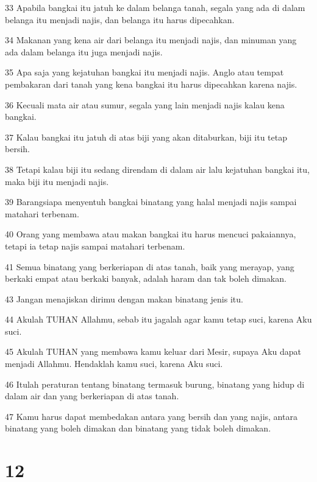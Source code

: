 \par 33 Apabila bangkai itu jatuh ke dalam belanga tanah, segala yang ada di dalam belanga itu menjadi najis, dan belanga itu harus dipecahkan.
\par 34 Makanan yang kena air dari belanga itu menjadi najis, dan minuman yang ada dalam belanga itu juga menjadi najis.
\par 35 Apa saja yang kejatuhan bangkai itu menjadi najis. Anglo atau tempat pembakaran dari tanah yang kena bangkai itu harus dipecahkan karena najis.
\par 36 Kecuali mata air atau sumur, segala yang lain menjadi najis kalau kena bangkai.
\par 37 Kalau bangkai itu jatuh di atas biji yang akan ditaburkan, biji itu tetap bersih.
\par 38 Tetapi kalau biji itu sedang direndam di dalam air lalu kejatuhan bangkai itu, maka biji itu menjadi najis.
\par 39 Barangsiapa menyentuh bangkai binatang yang halal menjadi najis sampai matahari terbenam.
\par 40 Orang yang membawa atau makan bangkai itu harus mencuci pakaiannya, tetapi ia tetap najis sampai matahari terbenam.
\par 41 Semua binatang yang berkeriapan di atas tanah, baik yang merayap, yang berkaki empat atau berkaki banyak, adalah haram dan tak boleh dimakan.
\par 43 Jangan menajiskan dirimu dengan makan binatang jenis itu.
\par 44 Akulah TUHAN Allahmu, sebab itu jagalah agar kamu tetap suci, karena Aku suci.
\par 45 Akulah TUHAN yang membawa kamu keluar dari Mesir, supaya Aku dapat menjadi Allahmu. Hendaklah kamu suci, karena Aku suci.
\par 46 Itulah peraturan tentang binatang termasuk burung, binatang yang hidup di dalam air dan yang berkeriapan di atas tanah.
\par 47 Kamu harus dapat membedakan antara yang bersih dan yang najis, antara binatang yang boleh dimakan dan binatang yang tidak boleh dimakan.

\chapter{12}

